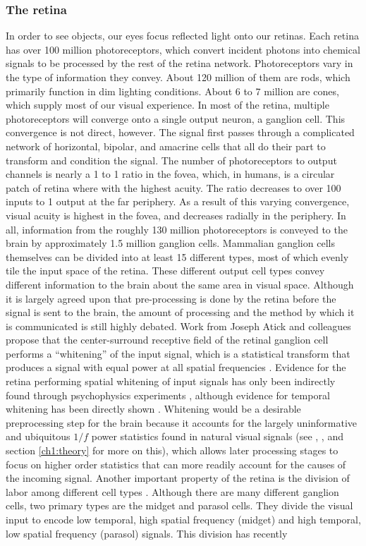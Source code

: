 \subsubsection{The retina}
In order to see objects, our eyes focus reflected light onto our retinas. Each retina has over 100 million photoreceptors, which convert incident photons into chemical signals to be processed by the rest of the retina network. Photoreceptors vary in the type of information they convey. About 120 million of them are rods, which primarily function in dim lighting conditions. About 6 to 7 million are cones, which supply most of our visual experience. In most of the retina, multiple photoreceptors will converge onto a single output neuron, a ganglion cell. This convergence is not direct, however. The signal first passes through a complicated network of horizontal, bipolar, and amacrine cells that all do their part to transform and condition the signal. The number of photoreceptors to output channels is nearly a 1 to 1 ratio in the fovea, which, in humans, is a circular patch of retina where with the highest acuity. The ratio decreases to over 100 inputs to 1 output at the far periphery. As a result of this varying convergence, visual acuity is highest in the fovea, and decreases radially in the periphery. In all, information from the roughly 130 million photoreceptors is conveyed to the brain by approximately 1.5 million ganglion cells. Mammalian ganglion cells themselves can be divided into at least 15 different types, most of which evenly tile the input space of the retina. These different output cell types convey different information to the brain about the same area in visual space. Although it is largely agreed upon that pre-processing is done by the retina before the signal is sent to the brain, the amount of processing and the method by which it is communicated is still highly debated. Work from Joseph Atick and colleagues propose that the center-surround receptive field of the retinal ganglion cell performs a ``whitening'' of the input signal, which is a statistical transform that produces a signal with equal power at all spatial frequencies \cite{atick1990towards, atick1992what} . Evidence for the retina performing spatial whitening of input signals has only been indirectly found through psychophysics experiments \cite{atick1992what}, although evidence for temporal whitening has been directly shown \cite{dong1995statistics}. Whitening would be a desirable preprocessing step for the brain because it accounts for the largely uninformative and ubiquitous $1/f$ power statistics found in natural visual signals (see \cite{field1999wavelets}, \cite{field1989statistics}, and section \ref{ch1:theory} for more on this), which allows later processing stages to focus on higher order statistics that can more readily account for the causes of the incoming signal. Another important property of the retina is the division of labor among different cell types \cite{van1995information}. Although there are many different ganglion cells, two primary types are the midget and parasol cells. They divide the visual input to encode low temporal, high spatial frequency (midget) and high temporal, low spatial frequency (parasol) signals. This division has recently 